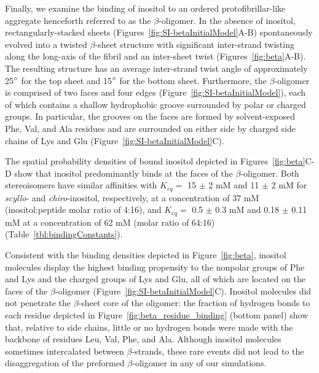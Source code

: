 Finally, we examine the binding of inositol to an ordered protofibrillar-like aggregate henceforth referred to as the $\beta$-oligomer. In the absence of inositol, rectangularly-stacked sheets (Figures~\ref{fig:SI-betaInitialModel}A-B) spontaneously evolved into a twisted $\beta$-sheet structure with significant inter-strand twisting along the long-axis of the fibril and an inter-sheet twist (Figures~\ref{fig:beta}A-B). The resulting structure has an average inter-strand twist angle of approximately 25$^\circ$ for the top sheet and 15$^\circ$ for the bottom sheet. Furthermore, the $\beta$-oligomer is comprised of two faces and four edges (Figure~\ref{fig:SI-betaInitialModel}), each of which contains a shallow hydrophobic groove surrounded by polar or charged groups.  In particular, the grooves on the faces are formed by solvent-exposed Phe, Val, and Ala residues and are surrounded on either side by charged side chains of Lys and Glu (Figure~\ref{fig:SI-betaInitialModel}C).

The spatial probability densities of bound inositol depicted in Figures~\ref{fig:beta}C-D show that inositol predominantly binds at the faces of the $\beta$-oligomer. Both stereoisomers have similar affinities with $K_{eq}=$ 15 $\pm$ 2 mM and 11 $\pm$ 2 mM for \emph{scyllo}- and \emph{chiro}-inositol, respectively, at a concentration of 37 mM (inositol:peptide molar ratio of 4:16), and $K_{eq}=$ 0.5 $\pm$ 0.3 mM and 0.18 $\pm$ 0.11 mM at a concentration of 62 mM (molar ratio of 64:16) (Table~\ref{tbl:bindingConstants}).   

Consistent with the binding densities depicted in Figure~\ref{fig:beta}, inositol molecules display the highest binding propensity to the nonpolar groups of Phe and Lys and the charged groups of Lys and Glu, all of which are located on the faces of the $\beta$-oligomer (Figure~\ref{fig:SI-betaInitialModel}C). Inositol molecules did not penetrate the $\beta$-sheet core of the oligomer: the fraction of hydrogen bonds to each residue depicted in Figure~\ref{fig:beta_residue_binding} (bottom panel) show that, relative to side chains, little or no hydrogen bonds were made with the backbone of residues Leu, Val, Phe, and Ala. Although inositol molecules sometimes intercalated between $\beta$-strands, these rare events did not lead to the disaggregation of the preformed $\beta$-oligomer in any of our simulations.

